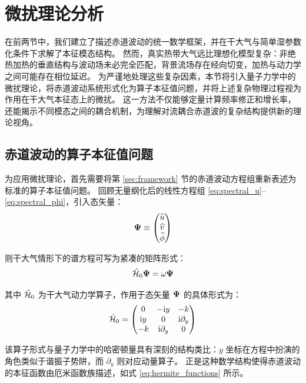 \section{微扰理论分析}
\label{sec:perturbation}

在前两节中，我们建立了描述赤道波动的统一数学框架，并在干大气与简单湿参数化条件下求解了本征模态结构。
然而，真实热带大气远比理想化模型复杂：非绝热加热的垂直结构与波动场未必完全匹配，背景流场存在经向切变，加热与动力学之间可能存在相位延迟。
为严谨地处理这些复杂因素，本节将引入量子力学中的微扰理论，将赤道波动系统形式化为算子本征值问题，并将上述复杂物理过程视为作用在干大气本征态上的微扰。
这一方法不仅能够定量计算频率修正和增长率，还能揭示不同模态之间的耦合机制，为理解对流耦合赤道波的复杂结构提供新的理论视角。

\subsection{赤道波动的算子本征值问题}
\label{subsec:operator_eigenvalue}

为应用微扰理论，首先需要将第 \ref{sec:framework} 节的赤道波动方程组重新表述为标准的算子本征值问题。
回顾无量纲化后的线性方程组 \eqref{eq:spectral_u}--\eqref{eq:spectral_phi}，引入态矢量：
\begin{equation}
    \bm{\Psi} \equiv \begin{pmatrix} \widehat{u} \\ \widehat{v} \\ \widehat{\phi} \end{pmatrix}
    \label{eq:state_vector}
\end{equation}

则干大气情形下的谱方程可写为紧凑的矩阵形式：
\begin{equation}
    \hat{\mathcal{H}}_0 \bm{\Psi} = \omega \bm{\Psi}
    \label{eq:eigenvalue_problem}
\end{equation}

其中 $\hat{\mathcal{H}}_0$ 为干大气动力学算子，作用于态矢量 $\bm{\Psi}$ 的具体形式为：
\begin{equation}
    \hat{\mathcal{H}}_0 = \begin{pmatrix}
        0 & -\mathrm{i} y & -k \\
        \mathrm{i} y & 0 & \mathrm{i}\partial_y \\
        -k & \mathrm{i}\partial_y & 0
    \end{pmatrix}
    \label{eq:dry_hamiltonian}
\end{equation}

该算子形式与量子力学中的哈密顿量具有深刻的结构类比：$y$ 坐标在方程中扮演的角色类似于谐振子势阱，而 $\partial_y$ 则对应动量算子。
正是这种数学结构使得赤道波动的本征函数由厄米函数族描述，如式 \eqref{eq:hermite_functions} 所示。

